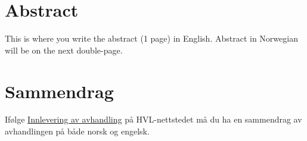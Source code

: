 \chapter{Abstract}
\label{abstract}
This is where you write the abstract (1 page) in English.
Abstract in Norwegian will be on the next double-page.

\chapter{Sammendrag}

Ifølge \href{https://www.hvl.no/forsking/forskarutdanning/praktisk-informasjon/innlevering-av-avhandling/}{Innlevering
av avhandling} på HVL-nettstedet må du ha en sammendrag av avhandlingen på både
norsk og engelsk.

